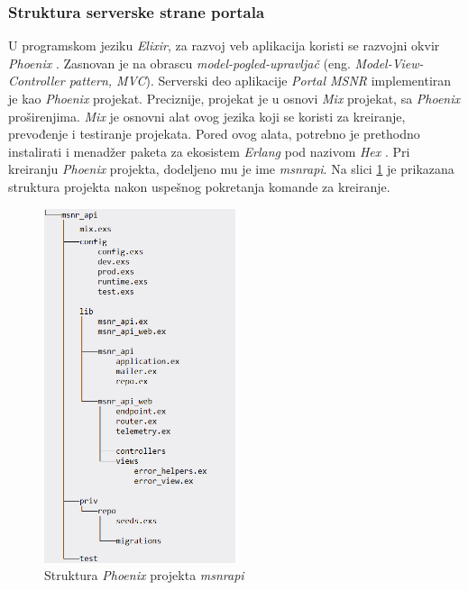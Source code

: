 \documentclass[12pt,oneside]{memoir}
\begin{document}
\subsubsection{Struktura serverske strane portala}
\par U programskom jeziku \emph{Elixir}, za razvoj veb aplikacija koristi se razvojni okvir \emph{Phoenix} \cite{phx}. Zasnovan je na obrascu \emph{model-pogled-upravljač} (eng. \emph{Model-View-Controller pattern, MVC}). Serverski deo aplikacije \emph{Portal MSNR} implementiran je kao \emph{Phoenix} projekat. Preciznije, projekat je u osnovi \emph{Mix} projekat, sa \emph{Phoenix} proširenjima. \emph{Mix} je osnovni alat ovog jezika koji se koristi za kreiranje, prevođenje i testiranje projekata. Pored ovog alata, potrebno je prethodno instalirati i menadžer paketa za ekosistem \emph{Erlang} pod nazivom \emph{Hex} \cite{hex}. Pri kreiranju \emph{Phoenix} projekta, dodeljeno mu je ime \emph{msnr{\textunderscore}api}. Na slici \ref{fig:msnr-str} je prikazana struktura projekta nakon uspešnog pokretanja komande za kreiranje. 

\begin{figure}[!ht]
  \centering
  \includegraphics[width=0.5\textwidth]{msnr-str.png}
  \caption{Struktura \emph{Phoenix} projekta \emph{msnr{\textunderscore}api} \cite{rad}}
  \label{fig:msnr-str}
\end{figure}
\end{document}
